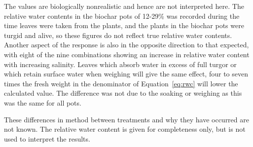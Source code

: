 The values are biologically nonrealistic and hence are not interpreted here. The relative water contents in the biochar pots of 12-29\% was recorded during the time leaves were taken from the plants, and the plants in the biochar pots were turgid and alive, so these figures do not reflect true relative water contents. Another aspect of the response is also in the opposite direction to that expected, with eight of the nine combinations showing an increase in relative water content with increasing salinity. Leaves which absorb water in excess of full turgor or which retain surface water when weighing will give the same effect, four to seven times the fresh weight in the denominator of Equation~\ref{eq:rwc} will lower the calculated value. The difference was not due to the soaking or weighing as this was the same for all pots.

These differences in method between treatments and why they have occurred are not known. The relative water content is given for completeness only, but is not used to interpret the results.

